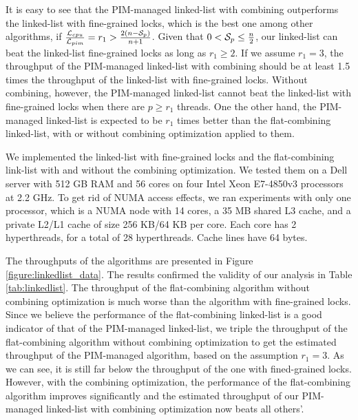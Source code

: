 It is easy to see that the PIM-managed linked-list with combining outperforms 
the linked-list with fine-grained locks, which is the best one among other algorithms, 
if ${\mathcal{L}_{cpu} \over \mathcal{L}_{pim}} = r_1 > {2(n - \mathcal{S}_{p})\over n + 1}$.
Given that $0 < \mathcal{S}_{p} \le {n \over 2}$, our linked-list can beat the linked-list fine-grained locks  
as long as $r_1 \ge 2$.
If we assume $r_1 = 3$, the throughput of the PIM-managed linked-list with combining should be 
at least 1.5 times the throughput of the linked-list with fine-grained locks.
Without combining, however, the PIM-managed linked-list cannot
beat the linked-list with fine-grained locks when there are $p \ge r_1$ threads.
One the other hand, the PIM-managed linked-list is expected to be $r_1$ times better than 
the flat-combining linked-list, with or without combining optimization applied to them.  

We implemented the linked-list with fine-grained locks and the flat-combining link-list 
with and without the combining optimization.
We tested them on a Dell server with 512 GB RAM and 
56 cores on four Intel Xeon E7-4850v3 processors at 2.2 GHz.
To get rid of NUMA access effects, we ran experiments with only one processor, 
which is a NUMA node with 14 cores, a 35 MB shared L3 cache, 
and a private L2/L1 cache of size 256 KB/64 KB per core. 
Each core has 2 hyperthreads, for a total of 28 hyperthreads. 
Cache lines have 64 bytes.

The throughputs of the algorithms are presented in Figure \ref{figure:linkedlist_data}.
The results confirmed the validity of our analysis in Table \ref{tab:linkedlist}.
The throughput of the flat-combining algorithm without combining optimization
is much worse than the algorithm with fine-grained locks.
Since we believe the performance of the flat-combining linked-list is a good 
indicator of that of the PIM-managed linked-list, we triple the throughput of the
flat-combining algorithm without combining optimization to get the estimated
throughput of the PIM-managed algorithm, based on the assumption $r_1 = 3$. 
As we can see, it is still far below the throughput of the one with fined-grained locks.
However, with the combining optimization, the performance of the flat-combining
algorithm improves significantly and the estimated throughput of our PIM-managed
linked-list with combining optimization now beats all others'.

